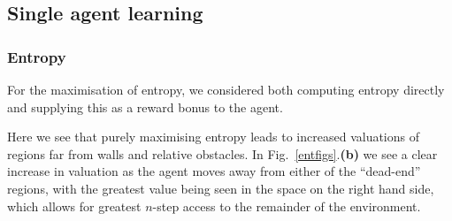 \documentclass{article}
\begin{document}
\subsection{Single agent learning\label{singlesect}}
\subsubsection{Entropy \label{entres}}
For the maximisation of entropy, we considered both computing entropy directly and supplying this as a reward bonus to the agent.

Here we see that purely maximising entropy leads to increased valuations of regions far from walls and relative obstacles. In Fig.~\ref{entfigs}.\textbf{(b)} we see a clear increase in valuation as the agent moves away from either of the ``dead-end'' regions, with the greatest value being seen in the space on the right hand side, which allows for greatest $n$-step access to the remainder of the environment.
\end{document}
